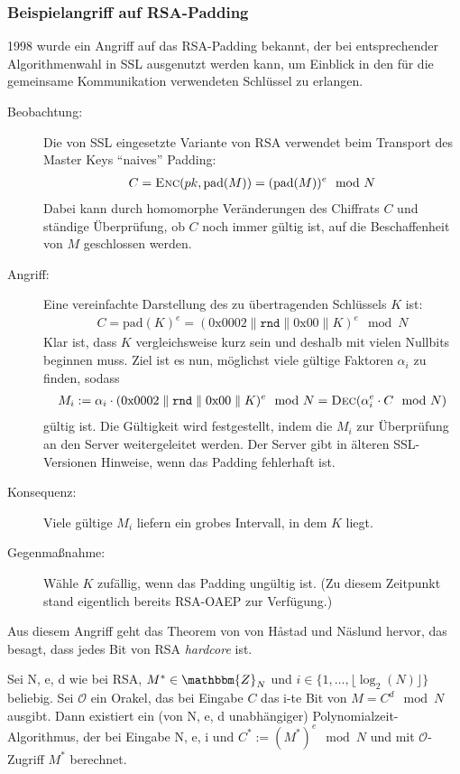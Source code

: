 \subsubsection{Beispielangriff auf RSA-Padding}
1998 wurde ein Angriff auf das RSA-Padding bekannt, der bei entsprechender Algorithmenwahl in SSL ausgenutzt werden kann, um Einblick
in den für die gemeinsame Kommunikation verwendeten Schlüssel zu erlangen.
\begin{description}
	\item[Beobachtung:] Die von SSL eingesetzte Variante von RSA verwendet beim Transport des Master Keys "`naives"' Padding:
		\begin{align*}
		C = \textsc{Enc}(pk, \text{pad}(M)) = (\text{pad}(M))^e \mod N
		\end{align*}
		Dabei kann durch homomorphe Veränderungen des Chiffrats $C$ und ständige Überprüfung, ob $C$ noch immer gültig ist, auf die
		Beschaffenheit von $M$ geschlossen werden.
	\item[Angriff:] Eine vereinfachte Darstellung des zu übertragenden Schlüssels $K$ ist:
		\begin{align*}
		C = \text{pad}(K)^e = (0\mathrm{x}0002 \parallel \mathtt{rnd} \parallel 0\mathrm{x}00 \parallel K)^e \mod N
		\end{align*}
		Klar ist, dass $K$ vergleichsweise kurz sein und deshalb mit vielen Nullbits beginnen muss. Ziel ist es nun, möglichst viele gültige Faktoren
		$\alpha_i$ zu finden, sodass 
		\begin{align*}
		M_i := \alpha_i \cdot (0\mathrm{x}0002 \parallel \mathtt{rnd} \parallel 0\mathrm{x}00 \parallel K)^e \mod N = \textsc{Dec}(\alpha_i^e \cdot C \mod
		N)
		\end{align*}
		gültig ist. Die Gültigkeit wird festgestellt, indem die $M_i$ zur Überprüfung an den Server weitergeleitet werden. Der Server gibt in
		älteren SSL-Versionen Hinweise, wenn das Padding fehlerhaft ist.
	\item[Konsequenz:] Viele gültige $M_i$ liefern ein grobes Intervall, in dem $K$ liegt.
	\item[Gegenmaßnahme:] Wähle $K$ zufällig, wenn das Padding ungültig ist. (Zu diesem Zeitpunkt stand eigentlich bereits RSA-OAEP zur Verfügung.)
\end{description}
Aus diesem Angriff geht das Theorem von von Håstad und Näslund hervor, das besagt, dass jedes Bit von RSA \emph{hardcore} ist.~\\
\begin{theorem}
Sei N, e, d wie bei RSA, $M^* \in \mathbbm{Z}_N$ und $i \in \{1, \ldots , \lfloor \log_2(N)\rfloor \}$ beliebig. Sei $\mathcal{O}$ ein
Orakel, das bei Eingabe $C$ das i-te Bit von $M = C^d \mod N$ ausgibt. Dann existiert ein (von N, e, d unabhängiger)
Polynomialzeit-Algorithmus, der bei Eingabe N, e, i und $C^* := (M^*)^e \mod N$ und mit $\mathcal{O}$-Zugriff $M^*$ berechnet.
\end{theorem}

